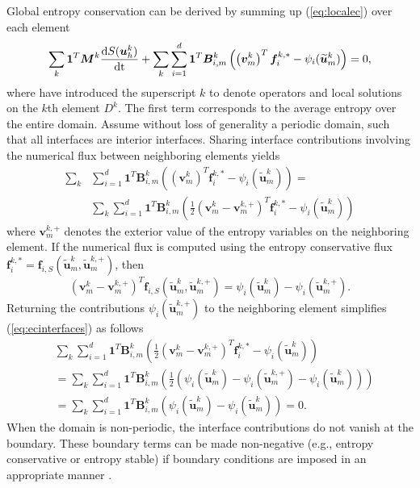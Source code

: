 \documentclass{svjour3}                     %
\renewcommand{\tilde}{\widetilde}
\newcommand{\td}[2]{\frac{{\rm d}#1}{{\rm d}{\rm #2}}}
\newcommand{\LRp}[1]{\left( #1 \right)}
\renewcommand{\note}[1]{{\color{blue}{#1}}}
\begin{document}
Global entropy conservation can be derived by summing up (\ref{eq:localec}) over each element
\[
\sum_k \bm{1}^T\bm{M}^k\td{S(\bm{u}^k_h)}{t} + \sum_k \sum_{i=1}^d \bm{1}^T\bm{B}^k_{i,m}\LRp{\LRp{\bm{v}^k_m}^T\bm{f}^{k,*}_i - \psi_i(\tilde{\bm{u}}^k_m)} = 0,
\]
where have introduced the superscript $k$ to denote operators and local solutions on the $k$th element $D^k$.  The first term corresponds to the average entropy over the entire domain.  Assume without loss of generality a periodic domain, such that all interfaces are interior interfaces.  Sharing interface contributions involving the numerical flux between neighboring elements yields 
\begin{align}
\sum_k &\sum_{i=1}^d \bm{1}^T\bm{B}^k_{i,m}\LRp{\LRp{\bm{v}^k_m}^T\bm{f}^{k,*}_i - \psi_i(\tilde{\bm{u}}^k_m)} = \label{eq:ecinterfaces}\\
&\sum_k \sum_{i=1}^d \bm{1}^T\bm{B}^k_{i,m}\LRp{\frac{1}{2}\LRp{\bm{v}^k_m- \bm{v}^{k,+}_m }^T\bm{f}^{k,*}_i - \psi_i(\tilde{\bm{u}}^k_m)}\nonumber
\end{align}
where $\bm{v}^{k,+}_m$ denotes the exterior value of the entropy variables on the neighboring element.  If the numerical flux is computed using the entropy conservative flux $\bm{f}^{k,*}_i = \bm{f}_{i,S}\LRp{\tilde{\bm{u}}^k_m,\tilde{\bm{u}}^{k,+}_m}$, then 
\[
\LRp{\bm{v}^k_m- \bm{v}^{k,+}_m }^T\bm{f}_{i,S}\LRp{\tilde{\bm{u}}^k_m,\tilde{\bm{u}}^{k,+}_m} = \psi_i(\tilde{\bm{u}}^k_m) - \psi_i(\tilde{\bm{u}}^{k,+}_m).
\]
Returning the contributions $\psi_i(\tilde{\bm{u}}^{k,+}_m)$ to the neighboring element simplifies (\ref{eq:ecinterfaces}) as follows
\begin{align*}
&\sum_k \sum_{i=1}^d \bm{1}^T\bm{B}^k_{i,m}\LRp{\frac{1}{2}\LRp{\bm{v}^k_m- \bm{v}^{k,+}_m }^T\bm{f}^{k,*}_i - \psi_i(\tilde{\bm{u}}^k_m)}\\
&= \sum_k \sum_{i=1}^d \bm{1}^T\bm{B}^k_{i,m}\LRp{\frac{1}{2}\LRp{\psi_i(\tilde{\bm{u}}^k_m) - \psi_i(\tilde{\bm{u}}^{k,+}_m) - \psi_i(\tilde{\bm{u}}^k_m)}}\\
&= \sum_k \sum_{i=1}^d \bm{1}^T\bm{B}^k_{i,m}\LRp{\psi_i(\tilde{\bm{u}}^k_m) - \psi_i(\tilde{\bm{u}}^k_m)} = 0.
\end{align*}
When the domain is non-periodic, the interface contributions do not vanish at the boundary.   These boundary terms can be made non-negative (e.g., entropy conservative or entropy stable) if boundary conditions are imposed in an appropriate manner \cite{svard2014entropy, chen2017entropy}.

\end{document}
